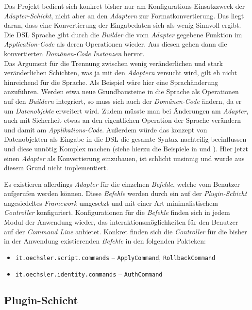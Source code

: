 Das Projekt bedient sich konkret bisher nur am Konfigurations-Einsatzzweck der \emph{Adapter-Schicht}, nicht aber an den \emph{Adaptern} zur Formatkonvertierung.
Das liegt daran, dass eine Konvertierung der Eingabedaten sich als wenig Sinnvoll ergibt.
Die DSL Sprache gibt durch die \emph{Builder} die vom \emph{Adapter} gegebene Funktion im \emph{Application-Code} als deren Operationen wieder.
Aus diesen gehen dann die konvertierten \emph{Domänen-Code} \emph{Instanzen} hervor.\\
Das Argument für die Trennung zwischen wenig veränderlichen und stark veränderlichen Schichten, was ja mit den \emph{Adaptern} versucht wird, gilt eh nicht hinreichend für die Sprache. 
Als Beispiel wäre hier eine Sprachänderung anzuführen.
Werden etwa neue Grundbausteine in die Sprache als Operationen auf den \emph{Buildern} integriert, so muss sich auch der \emph{Domänen-Code} ändern, da er um \emph{Datenobjekte} erweitert wird.
Zudem müsste man bei Änderungen am \emph{Adapter}, auch mit Sicherheit etwas an den eigentlichen Operation der Sprache verändern und damit am \emph{Applikations-Code}.
Außerdem würde das konzept von Datenobjekten als Eingabe in die DSL die gesamte Syntax nachteilig beeinflussen und diese unnötig Komplex machen (siehe hierzu die Beispiele in  und ).
Hier jetzt einen \emph{Adapter} als Konvertierung einzubauen, ist schlicht unsinnig und wurde aus diesem Grund nicht implementiert.

Es existieren allerdings \emph{Adapter} für die einzelnen \emph{Befehle}, welche vom Benutzer aufgerufen werden können.
Diese \emph{Befehle} werden durch ein auf der \emph{Plugin-Schicht} angesiedeltes \emph{Framework} umgesetzt und mit einer Art minimalistischem \emph{Controller} konfiguriert.
Konfigurationen für die \emph{Befehle} finden sich in jedem Modul der Anwendung wieder, das interaktionsmöglichkeiten für den Benutzer auf der \emph{Command Line} anbietet.
Konkret finden sich die \emph{Controller} für die bisher in der Anwendung existierenden \emph{Befehle} in den folgenden Pakteken:

\begin{itemize}
    \item \texttt{it.oechsler.script.commands} -- \texttt{ApplyCommand}, \texttt{RollbackCommand}
    \item \texttt{it.oechsler.identity.commands} -- \texttt{AuthCommand}
\end{itemize}

\subsection{Plugin-Schicht}
\label{subsec:plugin_schicht}

